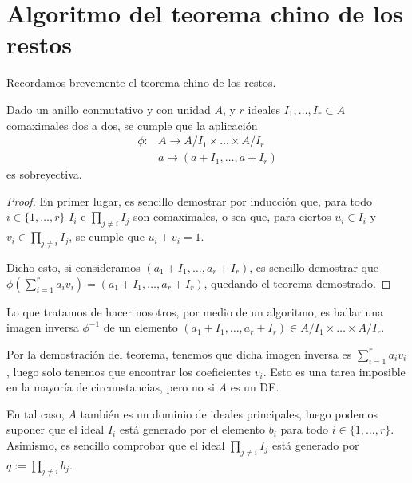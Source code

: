 \documentclass[a4paper, 11pt, twoside, notitlepage, openany, onecolumn, final]{report}
\begin{document}
	\section{Algoritmo del teorema chino de los restos}
	Recordamos brevemente el teorema chino de los restos.
	\begin{theo}
		Dado un anillo conmutativo y con unidad $A$, y $r$ ideales $I_1,\dots,I_r\subset A$ comaximales dos a dos, se cumple que la aplicación
		\begin{equation*}
			\begin{array}{cc}
			\phi:&A\to A/I_1\times\dots\times A/I_r\\
			& a\mapsto (a+I_1,\dots,a+I_r)
			\end{array}
		\end{equation*}
		es sobreyectiva.
	\end{theo}
	\begin{proof}
		En primer lugar, es sencillo demostrar por inducción que, para todo $i\in\{1,\dots,r\}$ $I_i$ e $\prod_{j\not= i}I_j$ son comaximales, o sea que, para ciertos $u_i\in I_i$ y $v_i\in\prod_{j\not= i}I_j$, se cumple que $u_i+v_i=1$.
		
		Dicho esto, si consideramos $(a_1+I_1,\dots,a_r+I_r)$, es sencillo demostrar que $\phi(\sum_{i=1}^ra_iv_i)=(a_1+I_1,\dots,a_r+I_r)$, quedando el teorema demostrado.
	\end{proof}
	Lo que tratamos de hacer nosotros, por medio de un algoritmo, es hallar una imagen inversa $\phi^{-1}$ de un elemento $(a_1+I_1,\dots,a_r+I_r)\in A/I_1\times\dots\times A/I_r$.
	
	Por la demostración del teorema, tenemos que dicha imagen inversa es $\sum_{i=1}^ra_iv_i$, luego solo tenemos que encontrar los coeficientes $v_i$. Esto es una tarea imposible en la mayoría de circunstancias, pero no si $A$ es un DE.
	
	En tal caso, $A$ también es un dominio de ideales principales, luego podemos suponer que el ideal $I_i$ está generado por el elemento $b_i$ para todo $i\in\{1,\dots,r\}$. Asimismo, es sencillo comprobar que el ideal $\prod_{j\not= i}I_j$ está generado por $q:=\prod_{j\not= i}b_j$.
	
\end{document}
